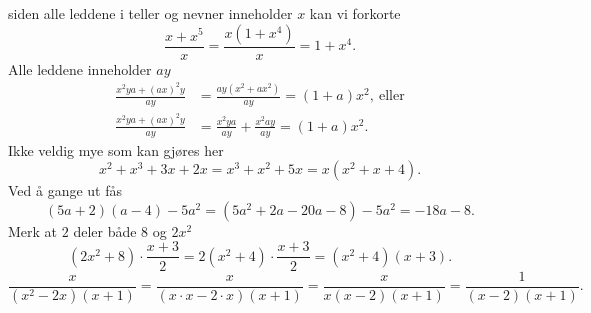 \documentclass[a4paper,11pt]{article}
\begin{document}
\begin{solution}
     siden alle leddene i teller og nevner
    inneholder $x$ kan vi forkorte
    \begin{equation}
        \frac{x + x^5}{x} = \frac{x(1+x^4)}{x} = 1 + x^4.
    \end{equation}
     Alle leddene inneholder $ay$
    \begin{align*}
           \frac{x^2 ya + (ax)^2 y}{ay}
        &= \frac{ay(x^2 + ax^2)}{ay}
         = (1 + a)x^2, \ \text{eller} \\
           \frac{x^2 ya + (ax)^2 y}{ay}
        &= \frac{x^2 ya}{ay} + \frac{x^2 ay}{ay}
         = (1 + a)x^2.
    \end{align*}
     Ikke veldig mye som kan gjøres her
    \begin{equation*}
        x^2 + x^3 + 3x + 2x = x^3 + x^2 + 5x = x(x^2 + x + 4).
    \end{equation*}
     Ved å gange ut fås
    \begin{equation*}
        (5a + 2)(a - 4) - 5a^2
        = (5a^2 + 2a - 20a - 8) - 5a^2 
        = -18a - 8.
    \end{equation*}    
     Merk at $2$ deler både $8$ og $2x^2$
    \begin{equation*}
          (2x^2 + 8) \cdot \frac{x+3}{2}
        = 2(x^2 + 4) \cdot \frac{x+3}{2}
        =  (x^2 + 4)(x + 3).
    \end{equation*}
    \begin{equation*}
          \frac{x}{(x^2 - 2x)(x+1)}
        = \frac{x}{(x\cdot x - 2\cdot x)(x+1)}
        = \frac{x}{x(x - 2)(x+1)}
        = \frac{1}{(x-2)(x+1)}.
    \end{equation*}
\end{solution}

\newpageLF

\end{document}
